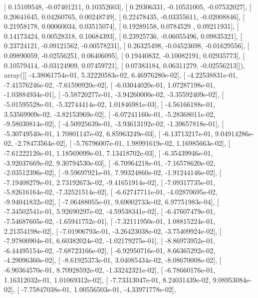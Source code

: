 \documentclass{article}
\begin{document}
       [ 0.15109548, -0.07401211,  0.10352603],
       [ 0.29306331, -0.10531005, -0.07532027],
       [ 0.20641645,  0.04260765,  0.00248749],
       [ 0.22478435, -0.03355611, -0.02008846],
       [ 0.21958178,  0.00060034,  0.03515074],
       [ 0.19289158,  0.0784529 ,  0.09211931],
       [ 0.14173424,  0.00528318,  0.10684393],
       [ 0.23925736, -0.06055496,  0.09835321],
       [ 0.23724121, -0.09121562, -0.00578231],
       [ 0.26325498, -0.04523698, -0.01629556],
       [ 0.09890059, -0.02556251,  0.06406095],
       [ 0.19440832, -0.10082191,  0.02935773],
       [ 0.10579414, -0.03124909,  0.07459721],
       [ 0.07383184,  0.06311279, -0.02556213]]), array([[ -4.38061754e-01,   5.32220583e-02,   6.46976280e-02],
       [ -4.22538831e-01,  -7.41576246e-02,  -7.61590920e-02],
       [ -6.03044020e-01,   1.07287198e-01,  -1.03884934e-01],
       [ -5.58720277e-01,  -3.94260000e-02,  -3.35592409e-02],
       [ -5.01595528e-01,  -5.32744414e-02,   1.01846981e-03],
       [ -4.56166188e-01,   3.53569909e-02,  -3.82153969e-02],
       [ -6.07241160e-01,  -5.28368011e-02,  -9.58030814e-02],
       [ -4.50925639e-01,  -3.93613192e-02,  -1.39657818e-01],
       [ -5.30749540e-01,   1.70801147e-02,   6.85963249e-03],
       [ -6.13713217e-01,   9.04914286e-02,  -2.78473564e-02],
       [ -5.76796007e-01,   1.98991619e-02,   1.16985663e-02],
       [ -7.61222120e-01,   1.18569099e-01,   7.13418702e-03],
       [ -6.35439946e-01,  -3.92037669e-02,   9.30794530e-03],
       [ -6.70964218e-01,  -7.16578620e-02,  -2.03512396e-02],
       [ -9.59697921e-01,   7.99324860e-02,  -1.91244146e-02],
       [ -7.19408279e-01,   2.73192673e-02,  -9.41651914e-02],
       [ -7.09317735e-01,  -5.82616164e-02,  -7.32521514e-02],
       [ -6.62747711e-01,  -4.02870695e-02,  -9.94041832e-02],
       [ -7.06488055e-01,   9.69002733e-02,   6.97751983e-04],
       [ -7.34502541e-01,   5.92690297e-02,  -4.59538341e-02],
       [ -6.47607479e-01,  -7.54687605e-02,  -1.65941752e-01],
       [ -7.32111950e-01,   1.08815224e-01,   2.21354198e-02],
       [ -7.01906793e-01,  -3.26423038e-02,  -3.75409924e-02],
       [ -7.97800904e-01,   6.60382024e-02,  -1.02179275e-01],
       [ -8.86973952e-01,  -6.44495154e-02,  -7.68723166e-02],
       [ -6.92950716e-01,   8.66365292e-02,  -4.29096360e-02],
       [ -8.61925373e-01,   3.04085434e-02,  -8.08670008e-02],
       [ -6.90364570e-01,   8.70928592e-02,  -1.33242321e-02],
       [ -6.78660176e-01,   1.16312032e-01,   1.01069312e-02],
       [ -7.73313047e-01,   8.24031439e-02,   9.08953084e-02],
       [ -7.75847038e-01,   1.00556503e-01,  -4.33971778e-02],
\end{document}
